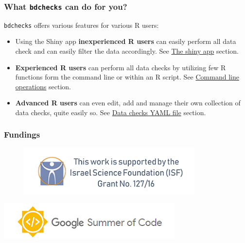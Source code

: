 \documentclass[]{book}
\providecommand{\tightlist}{%
  \setlength{\itemsep}{0pt}\setlength{\parskip}{0pt}}
\theoremstyle{definition}
\theoremstyle{definition}
\theoremstyle{definition}
\theoremstyle{remark}
\begin{document}
\subsubsection*{\texorpdfstring{What \texttt{bdchecks} can do for
you?}{What bdchecks can do for you?}}\label{what-bdchecks-can-do-for-you}

\texttt{bdchecks} offers various features for various R users:

\begin{itemize}
\tightlist
\item
  Using the Shiny app \textbf{inexperienced R users} can easily perform
  all data check and can easily filter the data accordingly. See
  \protect\hyperlink{the-shiny-app}{The shiny app} section.
\item
  \textbf{Experienced R users} can perform all data checks by utilizing
  few R functions form the command line or within an R script. See
  \protect\hyperlink{command-line-operations}{Command line operations}
  section.
\item
  \textbf{Advanced R users} can even edit, add and manage their own
  collection of data checks, quite easily so. See
  \protect\hyperlink{data-checks-yaml-file}{Data checks YAML file}
  section.
\end{itemize}

\subsubsection*{Fundings}\label{fundings}

\begin{figure}
\centering
\includegraphics{img/ISF.png}
\caption{}
\end{figure}

\href{https://summerofcode.withgoogle.com/\%20target=\%22_blank\%22}{\includegraphics{img/GSoC.png}}
\end{document}
